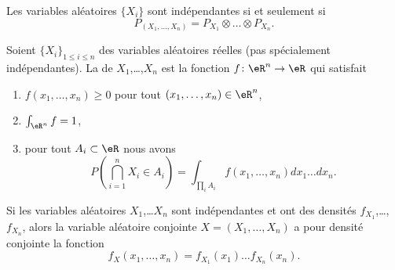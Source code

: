 \begin{proposition}     \label{PropPXXXPXPXPX}
    Les variables aléatoires \( \{ X_i \}\) sont indépendantes si et seulement si
    \begin{equation}
        P_{(X_1,\ldots,X_n)}=P_{X_1}\otimes\ldots\otimes P_{X_n}.
    \end{equation}
\end{proposition}

\begin{definition}      \label{DefFonrepConj}
    Soient \( \{ X_i \}_{1\leq i\leq n}\) des variables aléatoires réelles (pas spécialement indépendantes). La  de \( X_1\),\ldots,\( X_n\) est la fonction \( f\colon \eR^n\to \eR\) qui satisfait
    \begin{enumerate}
        \item
            \( f(x_1,\ldots,x_n)\geq 0\) pour tout \( (x_1,\ldots,x_n)\in\eR^n\),
        \item
            \( \int_{\eR^n}f=1\),
        \item       \label{ItemDefFonrepConjiii}
            pour tout \( A_i\subset\eR \) nous avons
            \begin{equation}
                P(\bigcap_{i=1}^n X_i\in A_i)=\int_{\prod_i A_i}f(x_1,\ldots,x_n)dx_1\ldots dx_n.
            \end{equation}
    \end{enumerate}
\end{definition}

\begin{proposition}     \label{PropDensiteConjIndep}
    Si les variables aléatoires \( X_1\),\ldots \( X_n\) sont indépendantes et ont des densités \( f_{X_1}\),\ldots,\( f_{X_n}\), alors la variable aléatoire conjointe \( X=(X_1,\ldots,X_n)\) a pour densité conjointe la fonction
    \begin{equation}
        f_X(x_1,\ldots,x_n)=f_{X_1}(x_1)\ldots f_{X_n}(x_n).
    \end{equation}
\end{proposition}

